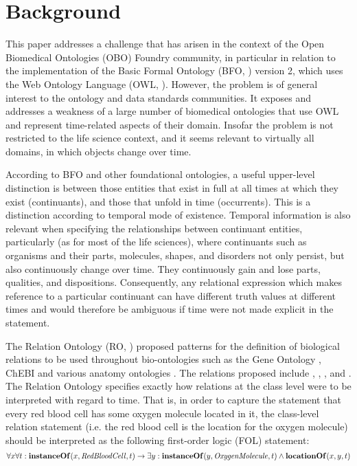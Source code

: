 \section*{Background}


This paper addresses a challenge that has arisen in the context of the Open Biomedical Ontologies (OBO) Foundry \cite{Smith2007} community, in particular in relation to the implementation of the Basic Formal Ontology (BFO, \cite{BFO2:Graz}) version 2, which uses the Web Ontology Language (OWL, \cite{grau2008}). However, the problem is of general interest to the %
ontology and data standards communities. It exposes and addresses a weakness of a large number of biomedical ontologies that use OWL and represent time-related
aspects of their domain. Insofar the problem is not restricted to the life science context, and it seems relevant to virtually all domains, in which objects change over time.   

According to BFO and other foundational ontologies, a useful upper-level distinction is between those entities that exist in full at all times at which they exist (continuants), and those that unfold in time (occurrents). This is a distinction according to temporal mode of existence. Temporal information is also relevant when specifying the relationships between continuant entities, particularly (as for most of the life sciences), where continuants such as organisms and their parts, molecules, shapes, and disorders not only persist, but also continuously change over time. They continuously gain and lose parts, qualities, and dispositions. Consequently, any relational expression which makes reference to a particular continuant can have different truth values at different times and would therefore be ambiguous if time were not made explicit in the statement. 

The Relation Ontology (RO, \cite{OBO:RO}) proposed patterns for the definition of biological relations to be used throughout bio-ontologies such as the Gene Ontology \cite{go2000}, ChEBI \cite{chebinar2013} and various anatomy ontologies \cite{uberon2012}. The relations proposed include , , , and  . The Relation Ontology specifies exactly how relations at the class level were to be interpreted with regard to time. That is, in order to capture the statement that every red blood cell has some oxygen molecule located in it, the class-level relation statement    (i.e. the red blood cell is the location for the oxygen molecule) should be interpreted as the following first-order logic (FOL) statement: 
\begin{equation}
\forall x \forall t : \mathrm{\mathbf{instanceOf}}(x, \mathit{RedBloodCell}, t) \rightarrow 
\exists y : \mathrm{\mathbf{instanceOf}}(y, \mathit{OxygenMolecule}, t) \wedge \mathrm{\mathbf{locationOf}}(x, y, t)
\end{equation}

